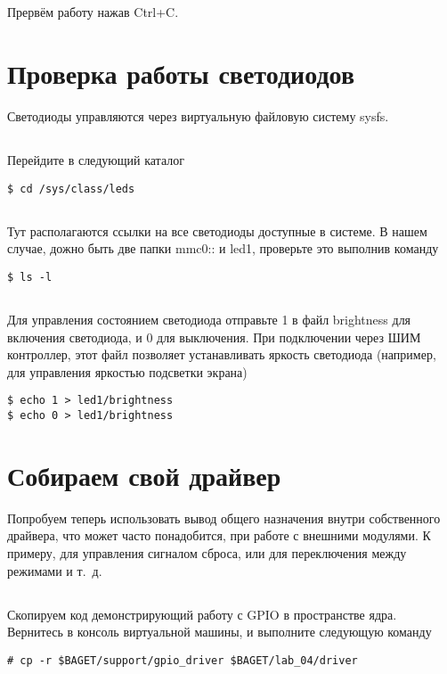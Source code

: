 \subsection{}Прервём работу нажав Ctrl+C.

\section{Проверка работы светодиодов}

Светодиоды управляются через виртуальную файловую систему sysfs. 

\subsection{}Перейдите в следующий каталог
\begin{lstlisting}[style=bash]
$ cd /sys/class/leds
\end{lstlisting}

\subsection{}Тут располагаются ссылки на все светодиоды доступные в системе. В нашем случае, дожно быть две папки mmc0:: и led1, проверьте это выполнив команду  
\begin{lstlisting}[style=bash]
$ ls -l
\end{lstlisting}

\subsection{}Для управления состоянием светодиода отправьте 1 в файл brightness для включения светодиода, и 0 для выключения. При подключении через ШИМ контроллер, этот файл позволяет устанавливать яркость светодиода (например, для управления яркостью подсветки экрана)
\begin{lstlisting}[style=bash]
$ echo 1 > led1/brightness
$ echo 0 > led1/brightness
\end{lstlisting}

\section{Собираем свой драйвер}
Попробуем теперь использовать вывод общего назначения внутри собственного драйвера, что может часто понадобится, при работе с внешними модулями. К примеру, для управления сигналом сброса, или для переключения между режимами и т. д.

\subsection{}Скопируем код демонстрирующий работу с GPIO в пространстве ядра. Вернитесь в консоль виртуальной машины, и выполните следующую команду
\begin{lstlisting}[style=bash]
# cp -r $BAGET/support/gpio_driver $BAGET/lab_04/driver
\end{lstlisting}

